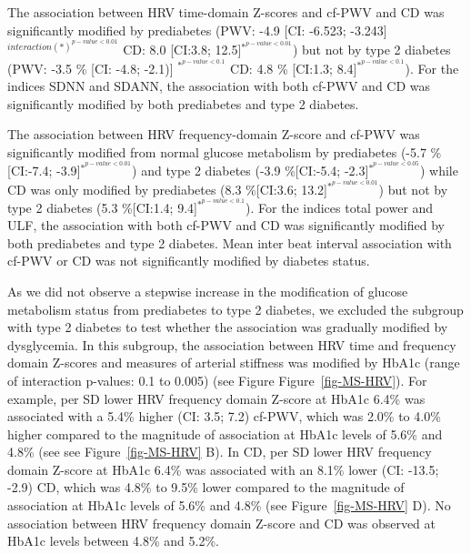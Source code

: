 \documentclass[
  a4paper,
  headsepline=true,
  open=any]{scrbook}
\begin{document}
The association between HRV time-domain Z-scores and cf-PWV and CD was
significantly modified by prediabetes (PWV: -4.9 {[}CI: -6.523;
-3.243{]} \(^{interaction(*) ^{p-value< 0.01}}\) CD: 8.0 {[}CI:3.8;
12.5{]}\(^{*^{p-value< 0.01}}\)) but not by type 2 diabetes (PWV: -3.5
\% {[}CI: -4.8; -2.1){]} \(^{*^{p-value< 0.1}}\) CD: 4.8 \% {[}CI:1.3;
8.4{]}\(^{*^{p-value< 0.1}}\)). For the indices SDNN and SDANN, the
association with both cf-PWV and CD was significantly modified by both
prediabetes and type 2 diabetes.

The association between HRV frequency-domain Z-score and cf-PWV was
significantly modified from normal glucose metabolism by prediabetes
(-5.7 \%{[}CI:-7.4; -3.9{]}\(^{*^{p-value< 0.01}}\)) and type 2 diabetes
(-3.9 \%{[}CI:-5.4; -2.3{]}\(^{*^{p-value< 0.05}}\)) while CD was only
modified by prediabetes (8.3 \%{[}CI:3.6;
13.2{]}\(^{*^{p-value< 0.01}}\)) but not by type 2 diabetes (5.3
\%{[}CI:1.4; 9.4{]}\(^{*^{p-value< 0.1}}\)). For the indices total power
and ULF, the association with both cf-PWV and CD was significantly
modified by both prediabetes and type 2 diabetes. Mean inter beat
interval association with cf-PWV or CD was not significantly modified by
diabetes status.

As we did not observe a stepwise increase in the modification of glucose
metabolism status from prediabetes to type 2 diabetes, we excluded the
subgroup with type 2 diabetes to test whether the association was
gradually modified by dysglycemia. In this subgroup, the association
between HRV time and frequency domain Z-scores and measures of arterial
stiffness was modified by HbA1c (range of interaction p-values: 0.1 to
0.005) (see Figure Figure~\ref{fig-MS-HRV}). For example, per SD lower
HRV frequency domain Z-score at HbA1c 6.4\% was associated with a 5.4\%
higher (CI: 3.5; 7.2) cf-PWV, which was 2.0\% to 4.0\% higher compared
to the magnitude of association at HbA1c levels of 5.6\% and 4.8\% (see
see Figure~\ref{fig-MS-HRV} B). In CD, per SD lower HRV frequency domain
Z-score at HbA1c 6.4\% was associated with an 8.1\% lower (CI: -13.5;
-2.9) CD, which was 4.8\% to 9.5\% lower compared to the magnitude of
association at HbA1c levels of 5.6\% and 4.8\% (see
Figure~\ref{fig-MS-HRV} D). No association between HRV frequency domain
Z-score and CD was observed at HbA1c levels between 4.8\% and 5.2\%.
\end{document}
